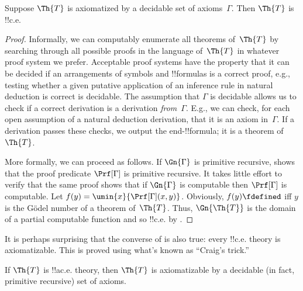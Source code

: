 \documentclass[../../../include/open-logic-section]{subfiles}
\begin{document}
\begin{prop} Suppose $\Th{T}$ is
axiomatized by a decidable set of axioms~$\Gamma$. Then $\Th{T}$ is
!!{c.e.}
\end{prop}

\begin{proof}
  Informally, we can computably enumerate all theorems of~$\Th{T}$ by
  searching through all possible proofs in the language
  of~$\Th{T}$ in whatever proof system we prefer. Acceptable proof
  systems have the property that it can be decided if an arrangements
  of symbols and !!{formula}s is a correct proof, e.g., testing whether
  a given putative application of an inference rule in natural deduction is
  correct is decidable. The assumption that $\Gamma$ is decidable
  allows us to check if a correct derivation is a derivation
  \emph{from}~$\Gamma$. E.g., we can check, for each open assumption
  of a natural deduction derivation, that it is an axiom in~$\Gamma$.
  If a derivation passes these checks, we output the end-!!{formula}; it
  is a theorem of~$\Th{T}$.

  More formally, we can proceed as follows. If $\Gn{\Gamma}$ is
  primitive recursive,  shows
  that the proof predicate $\Prf[\Gamma]$ is primitive recursive. It
  takes little effort to verify that the same proof shows that if
  $\Gn{\Gamma}$ is computable then $\Prf[\Gamma]$ is computable. Let
  $f(y) = \umin{x}{\Prf[\Gamma](x,y)}$. Obviously, $f(y)\fdefined$ iff
  $y$ is the G\"odel number of a theorem of~$\Th{T}$. Thus,
  $\Gn{\Th{T}}$ is the domain of a partial computable function and so
  !!{c.e.} by .
\end{proof}

It is perhaps surprising that the converse of
 is also true: every !!{c.e.} theory is
axiomatizable. This is proved using what's known as ``Craig's trick.''

\begin{prop}
If\/ $\Th{T}$ is !!a{c.e.} theory, then $\Th{T}$ is axiomatizable by a
decidable (in fact, primitive recursive) set of axioms.
\end{prop}
\end{document}
